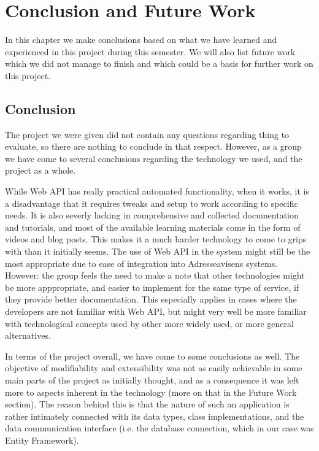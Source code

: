 \chapter{Conclusion and Future Work}
In this chapter we make conclusions based on what we have learned and experienced in this project during this semester. We will also list future work which we did not manage to finish and which could be a basis for further work on this project. 
\newpage


\section{Conclusion}

The project we were given did not contain any questions regarding thing to evaluate, so there are nothing to conclude in that respect. However, as a group we have come to several conclusions regarding the technology we used, and the project as a whole.

While Web API has really practical automated functionality, when it works, it is a disadvantage that it requires tweaks and setup to work according to specific needs. It is also severly lacking in comprehensive and collected documentation and tutorials, and most of the available learning materials come in the form of videos and blog posts. This makes it a much harder technology to come to grips with than it initially seems. The use of Web API in the system might still be the most appropriate due to ease of integration into Adresseavisens systems. However: the group feels the need to make a note that other technologies might be more apppropriate, and easier to implement for the same type of service, if they provide better documentation. This especially applies in cases where the developers are not familiar with Web API, but might very well be more familiar with technological concepts used by other more widely used, or more general alternatives.

In terms of the project overall, we have come to some conclusions as well. The objective of modifiability and extensibility was not as easily achievable in some main parts of the project as initially thought, and as a consequence it was left more to aspects inherent in the technology (more on that in the Future Work section). The reason behind this is that the nature of such an application is rather intimately connected with its data types, class implementations, and the data communication interface (i.e. the database connection, which in our case was Entity Framework).

